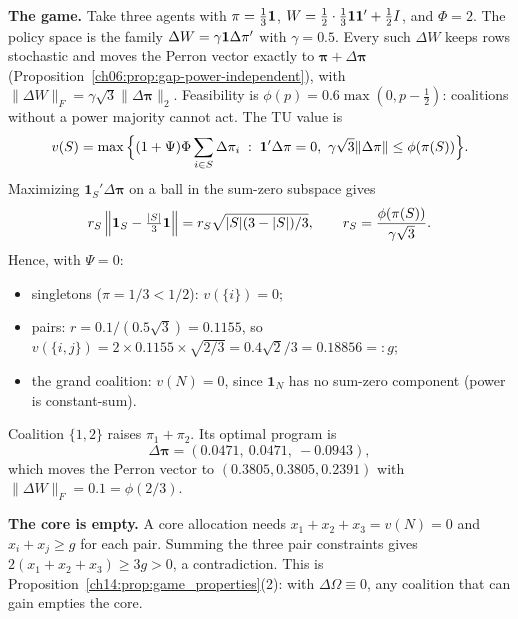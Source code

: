 \documentclass[../solutions_manual.tex]{subfiles}
\begin{document}
\textbf{The game.} Take three agents with $\pi = \frac13\mathbf{1}$, $W = \tfrac12\cdot\tfrac13\mathbf{1}\mathbf{1}' + \tfrac12 I$, and $\Phi = 2$. The policy space is the family $\Delta W = \gamma\mathbf{1}\Delta\pi'$ with $\gamma = 0.5$. Every such $\Delta W$ keeps rows stochastic and moves the Perron vector exactly to $\boldsymbol{\pi} + \Delta\boldsymbol{\pi}$ (Proposition~\ref{ch06:prop:gap-power-independent}), with $\|\Delta W\|_F = \gamma\sqrt3\|\Delta\boldsymbol{\pi}\|_2$. Feasibility is $\phi(p) = 0.6\max(0, p - \tfrac12)$: coalitions without a power majority cannot act. The TU value is
\[
v(S) = \max\Big\{(1+\Psi)\Phi\sum_{i\in S}\Delta\pi_i \;:\; \ones'\Delta\boldsymbol{\pi} = 0,\ \gamma\sqrt3\|\Delta\boldsymbol{\pi}\| \le \phi(\pi(S))\Big\}.
\]
Maximizing $\mathbf{1}_S'\Delta\boldsymbol{\pi}$ on a ball in the sum-zero subspace gives
\[
r_S\,\Big\|\mathbf{1}_S - \tfrac{|S|}{3}\mathbf{1}\Big\| = r_S\sqrt{|S|(3-|S|)/3}, \qquad r_S = \frac{\phi(\pi(S))}{\gamma\sqrt3}.
\] Hence, with $\Psi = 0$:
\begin{itemize}
\item singletons ($\pi = 1/3 < 1/2$): $v(\{i\}) = 0$;
\item pairs: $r = 0.1/(0.5\sqrt3) = 0.1155$, so $v(\{i,j\}) = 2\times 0.1155\times\sqrt{2/3} = 0.4\sqrt2/3 = 0.18856 =: g$;
\item the grand coalition: $v(N) = 0$, since $\mathbf{1}_N$ has no sum-zero component (power is constant-sum).
\end{itemize}
Coalition $\{1,2\}$ raises $\pi_1 + \pi_2$. Its optimal program is
\[
\Delta\boldsymbol{\pi} = (0.0471,\ 0.0471,\ -0.0943),
\]
which moves the Perron vector to $(0.3805, 0.3805, 0.2391)$ with $\|\Delta W\|_F = 0.1 = \phi(2/3)$.

\textbf{The core is empty.} A core allocation needs $x_1 + x_2 + x_3 = v(N) = 0$ and $x_i + x_j \ge g$ for each pair. Summing the three pair constraints gives $2(x_1 + x_2 + x_3) \ge 3g > 0$, a contradiction. This is Proposition~\ref{ch14:prop:game_properties}(2): with $\Delta\Omega \equiv 0$, any coalition that can gain empties the core.
\end{document}
